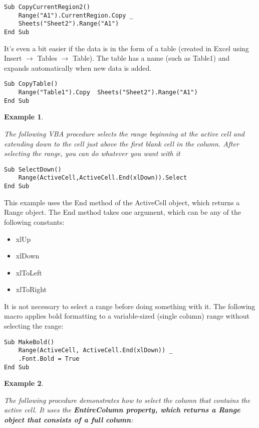 \documentclass[
]{article}
\theoremstyle{definition}
\theoremstyle{definition}
\newtheorem{example}{Example}[section]
\theoremstyle{definition}
\theoremstyle{definition}
\theoremstyle{remark}
\begin{document}
\begin{verbatim}
Sub CopyCurrentRegion2()
    Range("A1").CurrentRegion.Copy _
    Sheets("Sheet2").Range("A1")
End Sub
\end{verbatim}

It's even a bit easier if the data is in the form of a table (created in Excel using Insert \(\rightarrow\) Tables \(\rightarrow\) Table). The table has a name (such as Table1) and expands automatically when new data is
added.

\begin{verbatim}
Sub CopyTable()
    Range("Table1").Copy  Sheets("Sheet2").Range("A1")
End Sub
\end{verbatim}

\begin{example}
\protect\hypertarget{exm:unlabeled-div-29}{}\label{exm:unlabeled-div-29}

\emph{The following VBA procedure selects the range beginning
at the active cell and extending down to the cell just above the first
blank cell in the column. After selecting the range, you can do whatever
you want with it}

\end{example}

\begin{verbatim}
Sub SelectDown()
    Range(ActiveCell,ActiveCell.End(xlDown)).Select
End Sub
\end{verbatim}

This example uses the End method of the ActiveCell object, which returns
a Range object. The End method takes one argument, which can be any of
the following constants:

\begin{itemize}
\item
  xlUp
\item
  xlDown
\item
  xlToLeft
\item
  xlToRight
\end{itemize}

It is not necessary to select a range before doing something with it.
The following macro applies bold formatting to a variable-sized (single
column) range without selecting the range:

\begin{verbatim}
Sub MakeBold()
    Range(ActiveCell, ActiveCell.End(xlDown)) _
    .Font.Bold = True
End Sub
\end{verbatim}

\begin{example}
\protect\hypertarget{exm:unlabeled-div-30}{}\label{exm:unlabeled-div-30}

\emph{The following procedure demonstrates how to select the
column that contains the active cell. It uses the \textbf{EntireColumn
property, which returns a Range object that consists of a full
column}:}

\end{example}
\end{document}
